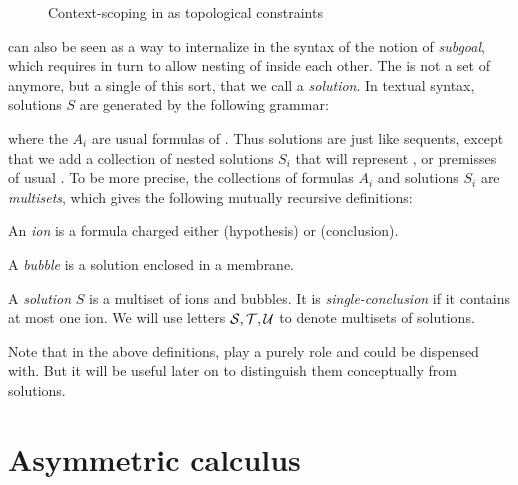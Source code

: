 \begin{scope}
\begin{figure}
\caption{Context-scoping in  as topological constraints}
\end{figure}
 can also be seen as a way to internalize in the syntax of  the
notion of \emph{subgoal}, which requires in turn to allow nesting of 
inside each other. The  is not a set of  anymore, but a
single  of this sort, that we call a \emph{solution}. In textual syntax, solutions $S$ are generated by the
following grammar:
where the $A_i$ are usual formulas of . Thus solutions are just like
sequents, except that we add a collection of nested solutions $S_i$ that will
represent , or premisses of usual . To be more precise,
the collections of formulas $A_i$ and solutions $S_i$ are \emph{multisets},
which gives the following mutually recursive definitions:
\begin{definition}[Ion]
An \emph{ion} is a formula charged either \emph{} (hypothesis) or
\emph{} (conclusion).
\end{definition}
\begin{definition}[Bubble]
A \emph{bubble} is a solution enclosed in a membrane.
\end{definition}
\begin{definition}[Solution]
A \emph{solution} $S$ is a multiset of ions and bubbles. It is
\emph{single-conclusion} if it contains at most one  ion. We will use
letters $\mathcal{S}, \mathcal{T}, \mathcal{U}$ to denote multisets of
solutions.
\end{definition}
Note that in the above definitions,  play a purely  role and
could be dispensed with. But it will be useful later on to distinguish them
conceptually from solutions.

\section{Asymmetric calculus}


\end{scope}
